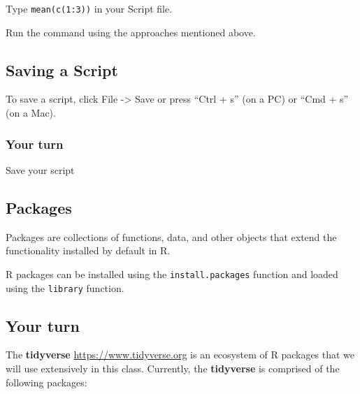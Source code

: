 \documentclass[
]{article}
\begin{document}
Type \texttt{mean(c(1:3))} in your Script file.

Run the command using the approaches mentioned above.

\hypertarget{saving-a-script}{%
\subsection{Saving a Script}\label{saving-a-script}}

To save a script, click File -\textgreater{} Save or press ``Ctrl + s''
(on a PC) or ``Cmd + s'' (on a Mac).

\hypertarget{your-turn-3}{%
\subsubsection{Your turn}\label{your-turn-3}}

Save your script

\hypertarget{packages}{%
\subsection{Packages}\label{packages}}

Packages are collections of functions, data, and other objects that
extend the functionality installed by default in R.

R packages can be installed using the \texttt{install.packages} function
and loaded using the \texttt{library} function.

\hypertarget{your-turn-4}{%
\subsection{Your turn}\label{your-turn-4}}

The \textbf{tidyverse} \url{https://www.tidyverse.org} is an ecosystem
of R packages that we will use extensively in this class. Currently, the
\textbf{tidyverse} is comprised of the following packages:
\end{document}

